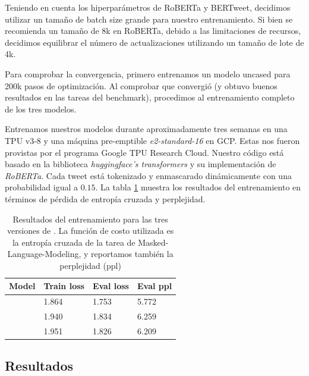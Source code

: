 Teniendo en cuenta los hiperparámetros de RoBERTa y BERTweet, decidimos utilizar un tamaño de batch size grande para nuestro entrenamiento. Si bien se recomienda un tamaño de 8k en RoBERTa, debido a las limitaciones de recursos, decidimos equilibrar el número de actualizaciones utilizando un tamaño de lote de 4k.

Para comprobar la convergencia, primero entrenamos un modelo uncased para 200k pasos de optimización. Al comprobar que convergió (y obtuvo buenos resultados en las tareas del benchmark), procedimos al entrenamiento completo de los tres modelos.

Entrenamos nuestros modelos durante aproximadamente tres semanas en una TPU v3-8 y una máquina pre-emptible \emph{e2-standard-16} en GCP. Estas nos fueron provistas por el programa Google TPU Research Cloud. Nuestro código está basado en la biblioteca \emph{huggingface's transformers}\cite{wolf-etal-2020-transformers} y su implementación de \emph{RoBERTa}. Cada tweet está tokenizado y enmascarado dinámicamente con una probabilidad igual a $ 0.15 $. La tabla \ref{tab:training_results} muestra los resultados del entrenamiento en términos de pérdida de entropía cruzada y perplejidad.

\begin{table}[h]
    \centering
    \begin{tabular}{l|l l l|}
        Model   & Train loss & Eval loss   & Eval ppl \\
        \hline
        \cased{}   & 1.864      & 1.753       & 5.772    \\
        \uncased{} & 1.940      & 1.834       & 6.259    \\
        \deacc{}   & 1.951      & 1.826       & 6.209
    \end{tabular}
    \caption{Resultados del entrenamiento para las tres versiones de \robertuito{}. La función de costo utilizada es la entropía cruzada de la tarea de Masked-Language-Modeling, y reportamos también la perplejidad (ppl)}
    \label{tab:training_results}
\end{table}


\subsection{Resultados}


